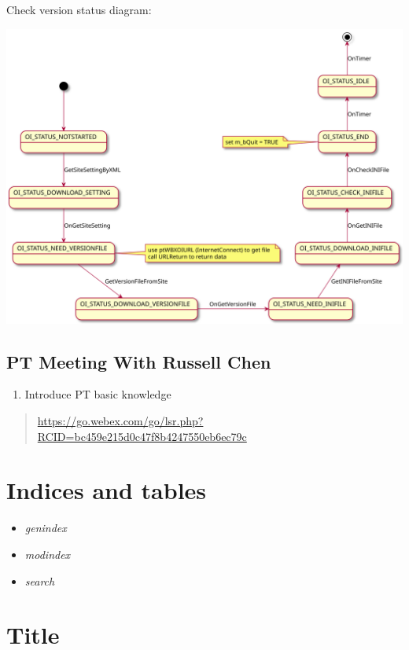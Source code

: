 \documentclass[letterpaper,10pt,english]{sphinxmanual}
\begin{document}
Check version status diagram:

\includegraphics{ptupdate_oi_status_state.svg}


\section{PT Meeting With \textbf{Russell Chen}}
\label{pt:pt-meeting-with-russell-chen}\begin{enumerate}
\item {} 
Introduce PT basic knowledge

\end{enumerate}
\begin{quote}

\href{https://go.webex.com/go/lsr.php?RCID=bc459e215d0c47f8b4247550eb6ec79c}{https://go.webex.com/go/lsr.php?RCID=bc459e215d0c47f8b4247550eb6ec79c}
\end{quote}


\chapter{Indices and tables}
\label{index:indices-and-tables}\begin{itemize}
\item {} 
\emph{genindex}

\item {} 
\emph{modindex}

\item {} 
\emph{search}

\end{itemize}


\chapter{Title}
\label{index:title}


\renewcommand{\indexname}{Index}
\printindex
\end{document}
